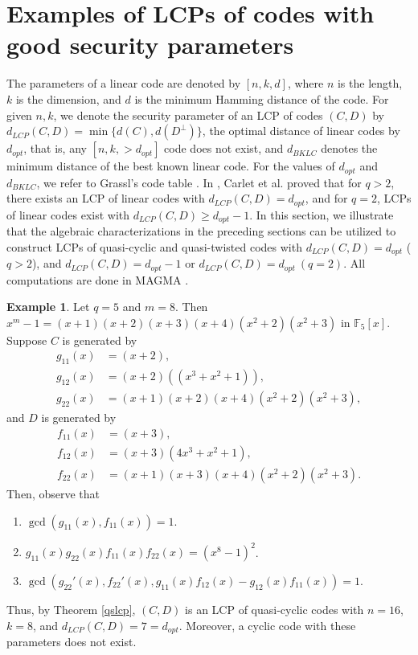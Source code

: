 \documentclass[12 pt]{extarticle}
\numberwithin{equation}{section}
\theoremstyle{definition}
\newtheorem{example}{Example}[section]
\begin{document}
\section{Examples of LCPs of codes  with good security parameters}\label{secexample}
 The parameters of a linear code are denoted by $[n,k,d]$, where $n$ is the length, $k$ is the dimension, and $d$ is the minimum Hamming distance of the code. For given $n,k $, we denote the security parameter of an LCP of codes $(C,D)$ by  $d_{LCP}(C,D)=\min\{d(C),d(D^{\perp})\}$, the optimal distance of linear codes by $d_{opt}$, that is, any $[n,k, >d_{opt}]$ code does not exist, and $d_{BKLC}$ denotes the minimum distance of the best known linear code. For the values of $d_{opt}$ and $d_{BKLC}$, we refer to Grassl's code table \cite{codetable}. 
 In \cite{carlet2019}, Carlet et al. proved that for $q>2$, there exists an LCP of linear codes with $d_{LCP}(C,D)=d_{opt}$, and for $q=2$, LCPs of linear codes exist with $d_{LCP}(C,D) \ge d_{opt}-1$.  In this section, we illustrate that the algebraic characterizations in the preceding sections can be utilized to construct LCPs of quasi-cyclic and quasi-twisted codes with $d_{LCP}(C,D)=d_{opt}$ ($q>2$), and $d_{LCP}(C,D)=d_{opt}-1$ or $d_{LCP}(C,D)=d_{opt}\  (q=2)$. 
 All computations are done in MAGMA \cite{magma}.

\begin{example}
 Let $q=5$ and $m=8$. Then $x^m-1=(x+1)(x+2)(x+3)(x+4)(x^2+2)(x^2+3)$  in $\mathbb{F}_5[x]$. Suppose $C$ is generated by
 \begin{equation*}
     \begin{split}
       g_{11}(x)&=(x+2),\\ 
       g_{12}(x)&=(x+2)((x^3 + x^2 + 1)),\\
     g_{22}(x)&=(x+1)(x+2)(x+4)(x^2+2)(x^2+3), 
     \end{split}
 \end{equation*}
  and $D$ is generated by 
  \begin{equation*}
     \begin{split}
       f_{11}(x)&=(x+3),\\ 
       f_{12}(x)&=(x+3)(4x^3 + x^2 + 1),\\
     f_{22}(x)&=(x+1)(x+3)(x+4)(x^2+2)(x^2+3).
     \end{split}
 \end{equation*}
 Then, observe that
 \begin{enumerate}
     \item $\gcd(g_{11}(x),f_{11}(x))=1$.
     \item $g_{11}(x)g_{22}(x)f_{11}(x)f_{22}(x)=(x^8-1)^2$.
     \item $\gcd(g_{22}'(x),f_{22}'(x),g_{11}(x)f_{12}(x)-g_{12}(x)f_{11}(x))=1$.     
 \end{enumerate}
 Thus, by Theorem \ref{qslcp}, $(C,D)$ is an LCP of quasi-cyclic codes with $n=16$, $k=8$, and $d_{LCP}(C,D)=7=d_{opt}$. Moreover, a cyclic code with these parameters does not exist.
\end{example}
\end{document}
